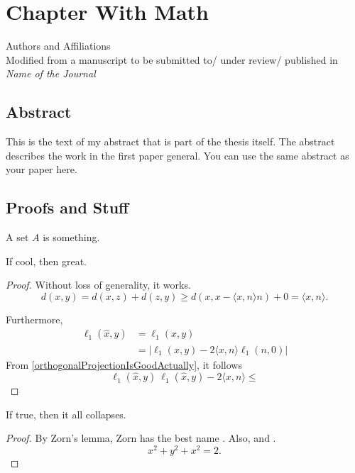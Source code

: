 \newcommand{\RipsD}{\operatorname{Rips}_1}
\newcommand{\Rips}{\operatorname{Rips}}
\newcommand{\ver}{\operatorname{ver}}
\newcommand{\diam}{\operatorname{Diam}}
\newcommand{\midR}{\operatorname{mid}}
\newcommand{\dN}{N_1^*}

\chapter{Chapter With Math}
\begin{center}
    Authors and Affiliations \\
    Modified from a manuscript to be submitted to/ under review/ published in \textit{Name of the Journal}
\end{center}

\section{Abstract}
This is the text of my abstract that is part of the thesis itself.
The abstract describes the work in the first paper general. You can use the same abstract as your paper here.
\section{Proofs and Stuff}
\begin{definition}
    A set $A$ is something.
\end{definition}

\begin{lemma}
    If cool, then great.
\end{lemma}
\begin{proof}
    Without loss of generality, it works.
    \begin{equation}
    \label{orthogonalProjectionIsGoodActually}
        d(x,y)= d(x,z)+d(z,y) \geq d(x,x-\langle x,n\rangle n )+0 = \langle x,n\rangle.
    \end{equation}

    Furthermore,
    \begin{align}
        \ell_1(\hat{x},y) & = \ell_1 (x,y)                     \\
                          & =|\ell_1(x,y)-2\langle x,n\rangle \ell_1(n,0)|        
    \end{align}
    From \autoref{orthogonalProjectionIsGoodActually}, it follows \[\ell_1(\hat{x},y)\ \ell_1(\hat{x},y)-2\langle x,n\rangle \leq\] 
\end{proof}




\begin{theorem}
    If true, then it all collapses.
\end{theorem}
\begin{proof}
    By Zorn's lemma, Zorn has the best name \autocite{martiniCompleteReducedConvex2019}.
    Also, \autocite{chenGraphHomotopyGraham2001} and \autocite{dochtermannMinimalGraphsContractible2023}.
    \[x^2+y^2+x^2=2.\]

\end{proof}

\printbibliography[heading=subbibnumbered]

